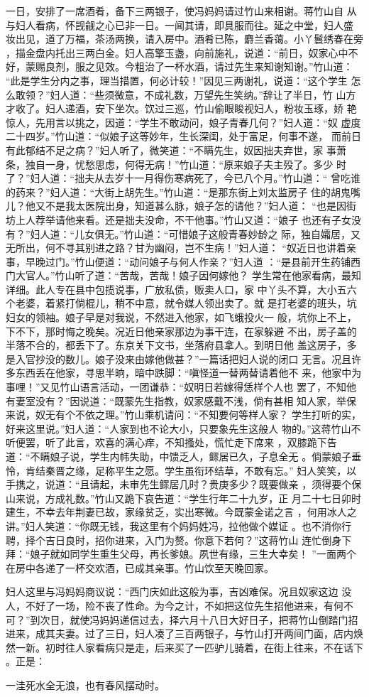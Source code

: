 一日，安排了一席酒肴，备下三两银子，使冯妈妈请过竹山来相谢。蒋竹山自
从与妇人看病，怀觊觎之心已非一日。一闻其请，即具服而往。延之中堂，妇人盛
妆出见，道了万福，茶汤两换，请入房中。酒肴已陈，麝兰香蔼。小丫鬟绣春在旁
，描金盘内托出三两白金。妇人高擎玉盏，向前施礼，说道：“前日，奴家心中不
好，蒙赐良剂，服之见效。今粗治了一杯水酒，请过先生来知谢知谢。”竹山道：
“此是学生分内之事，理当措置，何必计较！”因见三两谢礼，说道：“这个学生
怎么敢领？”妇人道：“些须微意，不成礼数，万望先生笑纳。”辞让了半日，竹
山方才收了。妇人递酒，安下坐次。饮过三巡，竹山偷眼睃视妇人，粉妆玉琢，娇
艳惊人，先用言以挑之，因道：“学生不敢动问，娘子青春几何？”妇人道：“奴
虚度二十四岁。”竹山道：“似娘子这等妙年，生长深闺，处于富足，何事不遂，
而前日有此郁结不足之病？”妇人听了，微笑道：“不瞒先生，奴因拙夫弃世，家
事萧条，独自一身，忧愁思虑，何得无病！”竹山道：“原来娘子夫主殁了。多少
时了？”妇人道：“拙夫从去岁十一月得伤寒病死了，今已八个月。”竹山道：“
曾吃谁的药来？”妇人道：“大街上胡先生。”竹山道：“是那东街上刘太监房子
住的胡鬼嘴儿？他又不是我太医院出身，知道甚么脉，娘子怎的请他？”妇人道：
“也是因街坊上人荐举请他来看。还是拙夫没命，不干他事。”竹山又道：“娘子
也还有子女没有？”妇人道：“儿女俱无。”竹山道：“可惜娘子这般青春妙龄之
际，独自孀居，又无所出，何不寻其别进之路？甘为幽闷，岂不生病！”妇人道：
“奴近日也讲着亲事，早晚过门。”竹山便道：“动问娘子与何人作亲？”妇人道
：“是县前开生药铺西门大官人。”竹山听了道：“苦哉，苦哉！娘子因何嫁他？
学生常在他家看病，最知详细。此人专在县中包揽说事，广放私债，贩卖人口，家
中丫头不算，大小五六个老婆，着紧打倘棍儿，稍不中意，就令媒人领出卖了。就
是打老婆的班头，坑妇女的领袖。娘子早是对我说，不然进入他家，如飞蛾投火一
般，坑你上不上，下不下，那时悔之晚矣。况近日他亲家那边为事干连，在家躲避
不出，房子盖的半落不合的，都丢下了。东京关下文书，坐落府县拿人。到明日他
盖这房子，多是入官抄没的数儿。娘子没来由嫁他做甚？”一篇话把妇人说的闭口
无言。况且许多东西丢在他家，寻思半晌，暗中跌脚：“嗔怪道一替两替请着他不
来，他家中为事哩！”又见竹山语言活动，一团谦恭：“奴明日若嫁得恁样个人也
罢了，不知他有妻室没有？”因说道：“既蒙先生指教，奴家感戴不浅，倘有甚相
知人家，举保来说，奴无有个不依之理。”竹山乘机请问：“不知要何等样人家？
学生打听的实，好来这里说。”妇人道：“人家到也不论大小，只要象先生这般人
物的。”这蒋竹山不听便罢，听了此言，欢喜的满心痒，不知搔处，慌忙走下席来
，双膝跪下告道：“不瞒娘子说，学生内帏失助，中馈乏人，鳏居已久，子息全无
。倘蒙娘子垂怜，肯结秦晋之缘，足称平生之愿。学生虽衔环结草，不敢有忘。”
妇人笑笑，以手携之，说道：“且请起，未审先生鳏居几时？贵庚多少？既要做亲
，须得要个保山来说，方成礼数。”竹山又跪下哀告道：“学生行年二十九岁，正
月二十七日卯时建生，不幸去年荆妻已故，家缘贫乏，实出寒微。今既蒙金诺之言
，何用冰人之讲。”妇人笑道：“你既无钱，我这里有个妈妈姓冯，拉他做个媒证
。也不消你行聘，择个吉日良时，招你进来，入门为赘。你意下若何？”这蒋竹山
连忙倒身下拜：“娘子就如同学生重生父母，再长爹娘。夙世有缘，三生大幸矣！
”一面两个在房中各递了一杯交欢酒，已成其亲事。竹山饮至天晚回家。

妇人这里与冯妈妈商议说：“西门庆如此这般为事，吉凶难保。况且奴家这边
没人，不好了一场，险不丧了性命。为今之计，不如把这位先生招他进来，有何不
可？”到次日，就使冯妈妈递信过去，择六月十八日大好日子，把蒋竹山倒踏门招
进来，成其夫妻。过了三日，妇人凑了三百两银子，与竹山打开两间门面，店内焕
然一新。初时往人家看病只是走，后来买了一匹驴儿骑着，在街上往来，不在话下
。正是：

一洼死水全无浪，也有春风摆动时。